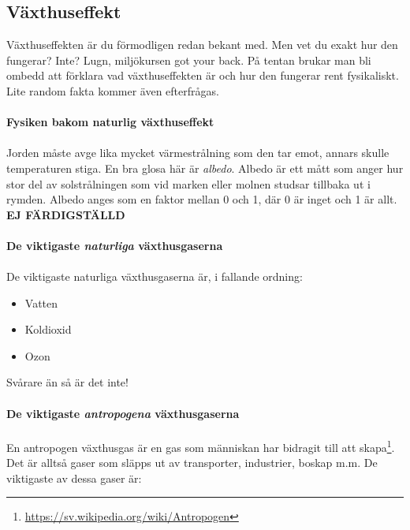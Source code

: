 \documentclass{article}
\begin{document}
\subsection{Växthuseffekt}
Växthuseffekten är du förmodligen redan bekant med. Men vet du exakt hur den fungerar? Inte? Lugn, miljökursen got your back. På tentan brukar man bli ombedd att förklara vad växthuseffekten är och hur den fungerar rent fysikaliskt. Lite random fakta kommer även efterfrågas.\\
\\
\textbf{Fysiken bakom naturlig växthuseffekt}\\
\\
Jorden måste avge lika mycket värmestrålning som den tar emot, annars skulle temperaturen stiga. En bra glosa här är \textit{albedo}. Albedo är ett mått som anger hur stor del av solstrålningen som vid marken eller molnen studsar tillbaka ut i rymden. Albedo anges som en faktor mellan 0 och 1, där 0 är inget och 1 är allt. \textbf{EJ FÄRDIGSTÄLLD}\\
\\
\textbf{De viktigaste \textit{naturliga} växthusgaserna}\\
\\
De viktigaste naturliga växthusgaserna är, i fallande ordning:
\begin{itemize}
    \item Vatten
    \item Koldioxid
    \item Ozon
\end{itemize}
Svårare än så är det inte!\\
\\
\textbf{De viktigaste \textit{antropogena} växthusgaserna}\\
\\
En antropogen växthusgas är en gas som människan har bidragit till att skapa\footnote{\url{https://sv.wikipedia.org/wiki/Antropogen}}. Det är alltså gaser som släpps ut av transporter, industrier, boskap m.m. De viktigaste av dessa gaser är:
\end{document}
